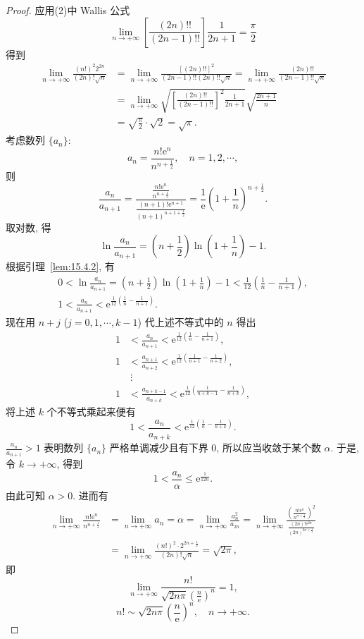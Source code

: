 \begin{proof}
应用(2)中 Wallis 公式
\[
  \lim_{n\to+\infty}\left[\frac{(2n)!!}{(2n-1)!!}\right]\frac{1}{2n+1}=\frac{\pi}{2} %
\]
得到
\[
  \begin{aligned}
    \lim_{n\to+\infty}\frac{(n!)^{2}2^{2n}}{(2n)!\sqrt{n}}&=\lim_{n\to+\infty}\frac{[(2n)!!]^{2}}{(2n-1)!!(2n)!!\sqrt{n}}=\lim_{n\to+\infty}\frac{(2n)!!}{(2n-1)!!\sqrt{n}}\\
    &=\lim_{n\to+\infty}\sqrt{\left[\frac{(2n)!!}{(2n-1)!!}\right]^{2}\frac{1}{2n+1}}\sqrt{\frac{2n+1}{n}}\\
    &=\sqrt{\frac{\pi}{2}}\cdot\sqrt{2}=\sqrt{\pi}.
  \end{aligned}
\]
考虑数列 $\{a_{n}\}$:
\[
  a_{n}=\frac{n!\mathrm{e}^{n}}{n^{n+\frac{1}{2}}},\quad n=1,2,\cdots,
\]
则
\[
  \frac{a_{n}}{a_{n+1}}=\frac{\frac{n!\mathrm{e}^{n}}{n^{n+\frac{1}{2}}}}{\frac{(n+1)!\mathrm{e}^{n+1}}{(n+1)^{n+1+\frac{1}{2}}}}=\frac{1}{\mathrm{e}}\left(1+\frac{1}{n}\right)^{n+\frac{1}{2}}.
\]
取对数, 得
\[
  \ln\frac{a_{n}}{a_{n+1}}=\left(n+\frac{1}{2}\right)\ln\left(1+\frac{1}{n}\right)-1.
\]
根据引理~\ref{lem:15.4.2}, 有
\[
  \begin{gathered}
    0<\ln\frac{a_{n}}{a_{n+1}}=\left(n+\frac{1}{2}\right)\ln\left(1+\frac{1}{n}\right)-1<\frac{1}{12}\left(\frac{1}{n}-\frac{1}{n+1}\right),\\
    1<\frac{a_{n}}{a_{n+1}}<\mathrm{e}^{\frac{1}{12}\left(\frac{1}{n}-\frac{1}{n+1}\right)}.
  \end{gathered}
\]
现在用 $n+j$ ($j=0,1,\cdots,k-1$) 代上述不等式中的 $n$ 得出
\[
  \begin{aligned}
    1&<\frac{a_{n}}{a_{n+1}}<\mathrm{e}^{\frac{1}{12}\left(\frac{1}{n}-\frac{1}{n+1}\right)},\\
    1&<\frac{a_{n+1}}{a_{n+2}}<\mathrm{e}^{\frac{1}{12}\left(\frac{1}{n+1}-\frac{1}{n+2}\right)},\\
    &\ \vdots\\
    1&<\frac{a_{n+k-1}}{a_{n+k}}<\mathrm{e}^{\frac{1}{12}\left(\frac{1}{n+k-1}-\frac{1}{n+k}\right)},
  \end{aligned}
\]
将上述 $k$ 个不等式乘起来便有
\[
  1<\frac{a_{n}}{a_{n+k}}<\mathrm{e}^{\frac{1}{12}\left(\frac{1}{n}-\frac{1}{n+k}\right)}.
\]
$\displaystyle\frac{a_{n}}{a_{n+1}}>1$ 表明数列 $\{a_{n}\}$ 严格单调减少且有下界 0, 所以应当收敛于某个数 $\alpha$. 于是, 令 $k\to+\infty$, 得到
\[
  1<\frac{a_{n}}{\alpha}\leqslant\mathrm{e}^{\frac{1}{12n}}.
\]
由此可知 $\alpha>0$. 进而有
\[
  \begin{aligned}
    \lim_{n\to+\infty}\frac{n!\mathrm{e}^{n}}{n^{n+\frac{1}{2}}}&=\lim_{n\to+\infty}a_{n}=\alpha=\lim_{n\to+\infty}\frac{a_{n}^{2}}{a_{2n}}=\lim_{n\to+\infty}\frac{\left(\frac{n!\mathrm{e}^{n}}{n^{n+\frac{1}{2}}}\right)^{2}}{\frac{(2n)!\mathrm{e}^{2n}}{(2n)^{2n+\frac{1}{2}}}}\\
    &=\lim_{n\to+\infty}\frac{(n!)^{2}\cdot 2^{2n+\frac{1}{2}}}{(2n)!\sqrt{n}}=\sqrt{2\pi},
  \end{aligned}
\]
即
\[
  \lim_{n\to+\infty}\frac{n!}{\sqrt{2n\pi}\left(\frac{n}{\mathrm{e}}\right)^{n}}=1,
\]
\[
  n!\sim\sqrt{2n\pi}\left(\frac{n}{\mathrm{e}}\right)^{n},\quad n\to+\infty.
\]
\end{proof}

